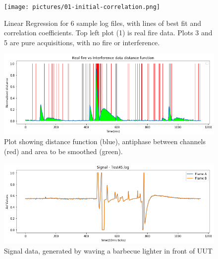 \begin{figure}[tb]
 \centering %
 \texttt{[image: pictures/01-initial-correlation.png]}
 \caption{Linear Regression for 6 sample log files, with lines of best fit and correlation coefficients. Top left plot (1) is real fire data. Plots 3 and 5 are pure acquisitions, with no fire or interference.}
 \label{fig:sample}
\end{figure}


\begin{figure}[tb]
 \centering %
 \includegraphics[width=\columnwidth]{pictures/02-area-to-filter.png}
 \caption{Plot showing distance function (blue), antiphase between channels (red) and area to be smoothed (green).}
 \label{fig:sample}
\end{figure}


\begin{figure}[tb]
 \centering %
 \includegraphics[width=\columnwidth]{pictures/05-signal.png}
 \caption{Signal data, generated by waving a barbecue lighter in front of UUT}
 \label{fig:sample}
\end{figure}

